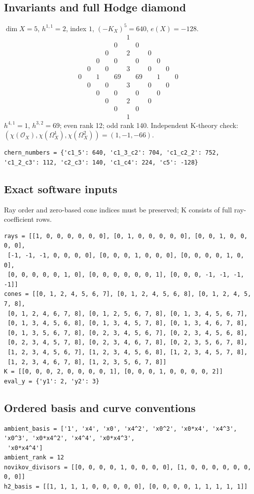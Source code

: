 \documentclass[10pt,a4paper]{article}
\begin{document}
\subsection*{Invariants and full Hodge diamond}
$\dim X=5$, $h^{1,1}=2$, index $1$, $(-K_X)^5=640$, $e(X)=-128$.
\[\begin{array}{ccccccccccc}&&&&&1&&&&&\\&&&&0&&0&&&&\\&&&0&&2&&0&&&\\&&0&&0&&0&&0&&\\&0&&0&&3&&0&&0&\\0&&1&&69&&69&&1&&0\\&0&&0&&3&&0&&0&\\&&0&&0&&0&&0&&\\&&&0&&2&&0&&&\\&&&&0&&0&&&&\\&&&&&1&&&&&\end{array}\]
$h^{4,1}=1$, $h^{3,2}=69$; even rank 12; odd rank 140.
Independent K-theory check: $(\chi(\mathcal O_X),\chi(\Omega_X^1),\chi(\Omega_X^2))=(1, -1, -66)$.
\begin{lstlisting}
chern_numbers = {'c1_5': 640, 'c1_3_c2': 704, 'c1_c2_2': 752, 'c1_2_c3': 112, 'c2_c3': 140, 'c1_c4': 224, 'c5': -128}
\end{lstlisting}
\subsection*{Exact software inputs}
Ray order and zero-based cone indices must be preserved; K consists of full ray-coefficient rows.
\begin{lstlisting}
rays = [[1, 0, 0, 0, 0, 0, 0], [0, 1, 0, 0, 0, 0, 0], [0, 0, 1, 0, 0, 0, 0],
 [-1, -1, -1, 0, 0, 0, 0], [0, 0, 0, 1, 0, 0, 0], [0, 0, 0, 0, 1, 0, 0],
 [0, 0, 0, 0, 0, 1, 0], [0, 0, 0, 0, 0, 0, 1], [0, 0, 0, -1, -1, -1, -1]]
cones = [[0, 1, 2, 4, 5, 6, 7], [0, 1, 2, 4, 5, 6, 8], [0, 1, 2, 4, 5, 7, 8],
 [0, 1, 2, 4, 6, 7, 8], [0, 1, 2, 5, 6, 7, 8], [0, 1, 3, 4, 5, 6, 7],
 [0, 1, 3, 4, 5, 6, 8], [0, 1, 3, 4, 5, 7, 8], [0, 1, 3, 4, 6, 7, 8],
 [0, 1, 3, 5, 6, 7, 8], [0, 2, 3, 4, 5, 6, 7], [0, 2, 3, 4, 5, 6, 8],
 [0, 2, 3, 4, 5, 7, 8], [0, 2, 3, 4, 6, 7, 8], [0, 2, 3, 5, 6, 7, 8],
 [1, 2, 3, 4, 5, 6, 7], [1, 2, 3, 4, 5, 6, 8], [1, 2, 3, 4, 5, 7, 8],
 [1, 2, 3, 4, 6, 7, 8], [1, 2, 3, 5, 6, 7, 8]]
K = [[0, 0, 0, 2, 0, 0, 0, 0, 1], [0, 0, 0, 1, 0, 0, 0, 0, 2]]
eval_y = {'y1': 2, 'y2': 3}
\end{lstlisting}
\subsection*{Ordered basis and curve conventions}
\begin{lstlisting}
ambient_basis = ['1', 'x4', 'x0', 'x4^2', 'x0^2', 'x0*x4', 'x4^3', 'x0^3', 'x0*x4^2', 'x4^4', 'x0*x4^3',
 'x0*x4^4']
ambient_rank = 12
novikov_divisors = [[0, 0, 0, 0, 1, 0, 0, 0, 0], [1, 0, 0, 0, 0, 0, 0, 0, 0]]
h2_basis = [[1, 1, 1, 1, 0, 0, 0, 0, 0], [0, 0, 0, 0, 1, 1, 1, 1, 1]]
\end{lstlisting}
\end{document}
